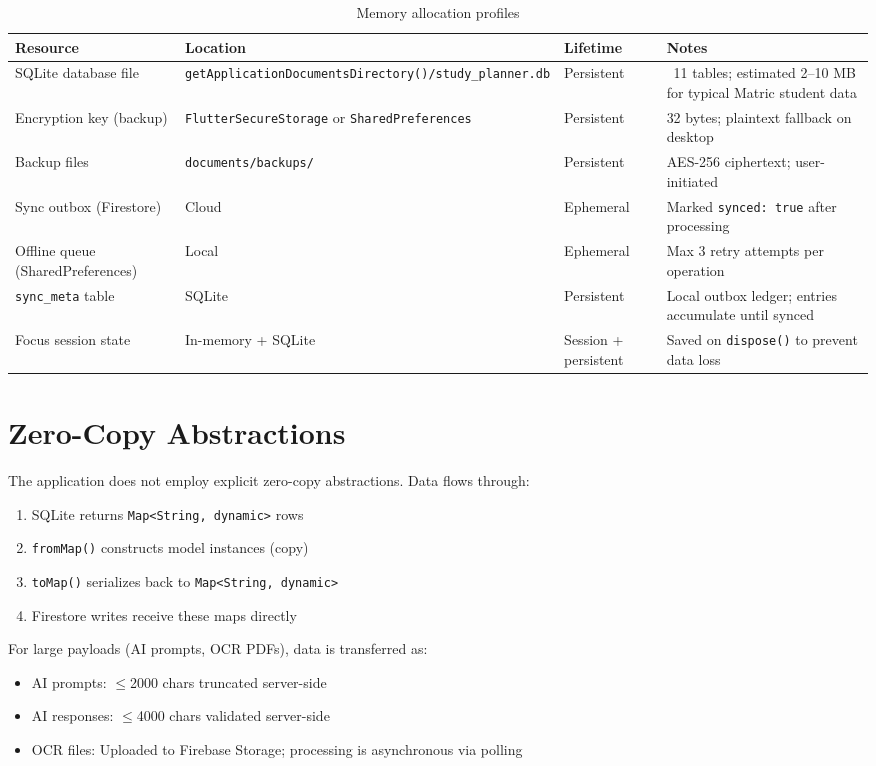 \documentclass[12pt,a4paper,openany]{report}
\begin{document}
\begin{table}[H]
\centering
\caption{Memory allocation profiles}
\label{tab:memory}
\begin{tabular}{llll}
\toprule
\textbf{Resource} & \textbf{Location} & \textbf{Lifetime} & \textbf{Notes} \\
\midrule
SQLite database file & \texttt{getApplicationDocumentsDirectory()/study\_planner.db} & Persistent & ~11 tables; estimated 2--10 MB for typical Matric student data \\
Encryption key (backup) & \texttt{FlutterSecureStorage} or \texttt{SharedPreferences} & Persistent & 32 bytes; plaintext fallback on desktop \\
Backup files & \texttt{documents/backups/} & Persistent & AES-256 ciphertext; user-initiated \\
Sync outbox (Firestore) & Cloud & Ephemeral & Marked \texttt{synced: true} after processing \\
Offline queue (SharedPreferences) & Local & Ephemeral & Max 3 retry attempts per operation \\
\texttt{sync\_meta} table & SQLite & Persistent & Local outbox ledger; entries accumulate until synced \\
Focus session state & In-memory + SQLite & Session + persistent & Saved on \texttt{dispose()} to prevent data loss \\
\bottomrule
\end{tabular}
\end{table}

\section{Zero-Copy Abstractions}

The application does not employ explicit zero-copy abstractions. Data flows through:
\begin{enumerate}[leftmargin=*]
  \item SQLite returns \texttt{Map<String, dynamic>} rows
  \item \texttt{fromMap()} constructs model instances (copy)
  \item \texttt{toMap()} serializes back to \texttt{Map<String, dynamic>}
  \item Firestore writes receive these maps directly
\end{enumerate}

For large payloads (AI prompts, OCR PDFs), data is transferred as:
\begin{itemize}[leftmargin=*]
  \item AI prompts: $\le$2000 chars truncated server-side
  \item AI responses: $\le$4000 chars validated server-side
  \item OCR files: Uploaded to Firebase Storage; processing is asynchronous via polling
\end{itemize}
\end{document}
